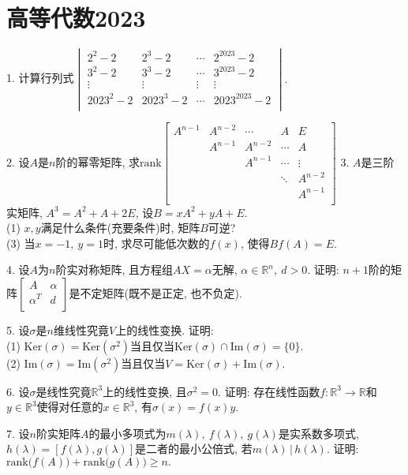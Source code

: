 \documentclass[12pt, a4paper, twoside]{ctexart}%
\begin{document}
	\section{高等代数2023}
	1. 计算行列式$\begin{vmatrix}
			2^2-2& 2^3-2 &\cdots &2^{2023}-2 \\
			3^2-2& 3^3-2 &\cdots &3^{2023}-2 \\
			\vdots &\vdots&\vdots&\vdots\\
			2023^2-2& 2023^3-2 &\cdots &2023^{2023}-2 \\
		\end{vmatrix}.$\par 
	2. 设$A$是$n$阶的幂零矩阵, 求$\mathrm{rank}\begin{bmatrix}
		A^{n-1} & A^{n-2} & \cdots &A &E \\
			& A^{n-1} & A^{n-2}	&\cdots& A\\
			&		& A^{n-1}&\cdots&\vdots\\
			& & &\ddots &A^{n-2}\\
			& & & &A^{n-1}\\
	\end{bmatrix}$
	3. $A$是三阶实矩阵, $A^3=A^2+A+2E$, 设$B=xA^2+yA+E$.\\
	(1) $x,y$满足什么条件(充要条件)时, 矩阵$B$可逆?\\
	(3) 当$x=-1,\ y=1$时, 求尽可能低次数的$f(x)$, 使得$Bf(A)=E$.\par 
	4. 设$A$为$n$阶实对称矩阵, 且方程组$AX=\alpha$无解, $\alpha\in\mathbb{R}^n,\ d>0$. 证明: $n+1$阶的矩阵$\begin{bmatrix}
		A & \alpha\\
		\alpha^T & d\\
	\end{bmatrix}$是不定矩阵(既不是正定, 也不负定). \par 
	5. 设$\sigma$是$n$维线性究竟$V$上的线性变换. 证明: \\
	(1) $\mathrm{Ker}(\sigma)=\mathrm{Ker}(\sigma^2)$当且仅当$\mathrm{Ker}(\sigma)\cap\mathrm{Im}(\sigma)=\{0\}$.\\
	(2) $\mathrm{Im}(\sigma)=\mathrm{Im}(\sigma^2)$当且仅当$V=\mathrm{Ker}(\sigma)+\mathrm{Im}(\sigma).$\par 
	6. 设$\sigma$是线性究竟$\mathbb{R}^3$上的线性变换, 且$\sigma^2=0$. 证明: 存在线性函数$f: \mathbb{R}^3\to \mathbb{R}$和$y\in\mathbb{R}^3$使得对任意的$x\in\mathbb{R}^3$, 有$\sigma(x)=f(x)y$.\par 
	7. 设$n$阶实矩阵$A$的最小多项式为$m(\lambda),\ f(\lambda),\ g(\lambda)$是实系数多项式, $h(\lambda)=[f(\lambda),g(\lambda)]$是二者的最小公倍式, 若$m(\lambda)\,\big|\,h(\lambda)$. 证明: $\mathrm{rank}\big(f(A)\big)+\mathrm{rank}\big(g(A)\big)\ge n.$\par 
\end{document}
